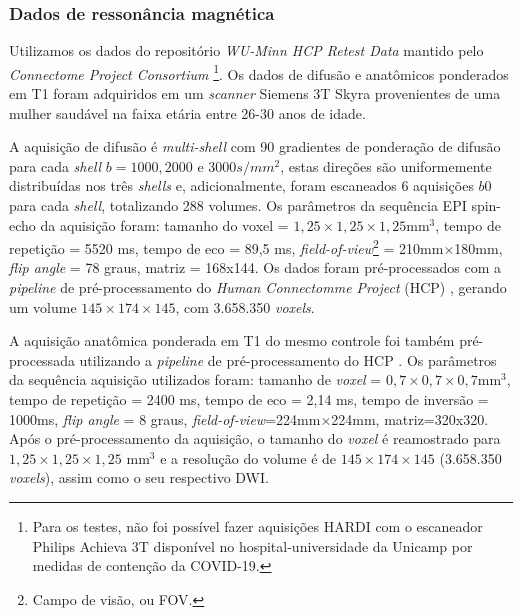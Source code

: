 \subsubsection{Dados de ressonância magnética}
\label{sssec::dados_de_ressonancia_magnetica}


Utilizamos os dados do repositório \textit{WU-Minn HCP Retest Data} mantido pelo \textit{Connectome Project Consortium} \cite{essen2012}\footnote{Para os testes, não foi possível fazer aquisições HARDI com o escaneador Philips Achieva 3T disponível no hospital-universidade da Unicamp por medidas de contenção da COVID-19.}.
Os dados de difusão e anatômicos ponderados em T1 foram adquiridos em um \textit{scanner} Siemens 3T Skyra provenientes de uma mulher saudável na faixa etária entre 26-30 anos de idade.

A aquisição de difusão é \textit{multi-shell} com 90 gradientes de ponderação de difusão para cada \textit{shell} $b = 1000, 2000$ e $3000 s/mm^2$, estas direções são uniformemente distribuídas nos três \textit{shells} e, adicionalmente, foram escaneados 6 aquisições $b0$ para cada \textit{shell}, totalizando 288 volumes. Os parâmetros da sequência EPI spin-echo da aquisição foram: tamanho do voxel = $1,25\times 1,25 \times 1,25$mm$^3$, tempo de repetição = 5520 ms, tempo de eco = 89,5 ms, \textit{field-of-view}\footnote{Campo de visão, ou FOV.} = 210mm$\times$180mm, \textit{flip angle} = 78 graus, matriz = 168x144. Os dados foram pré-processados com a \textit{pipeline} de pré-processamento do \textit{Human Connectomme Project} (HCP) \cite{glasser2013}, gerando um volume $145\times 174\times  145$, com 3.658.350 \textit{voxels}.

A aquisição anatômica ponderada em T1 do mesmo controle foi também pré-processada utilizando a \textit{pipeline} de pré-processamento do HCP \cite{glasser2013}. Os parâmetros da sequência aquisição utilizados foram: tamanho de \textit{voxel} = $0,7\times 0,7 \times 0,7$mm$^3$, tempo de repetição = 2400 ms, tempo de eco = 2,14 ms, tempo de inversão = 1000ms, \textit{flip angle} = 8 graus, \textit{field-of-view}=224mm$\times$224mm, matriz=320x320. Após o pré-processamento da aquisição, o tamanho do \textit{voxel} é reamostrado para $1,25\times 1,25 \times 1,25$ mm$^3$ e a resolução do volume é de $145\times 174\times 145$ (3.658.350 \textit{voxels}), assim como o seu respectivo DWI.

